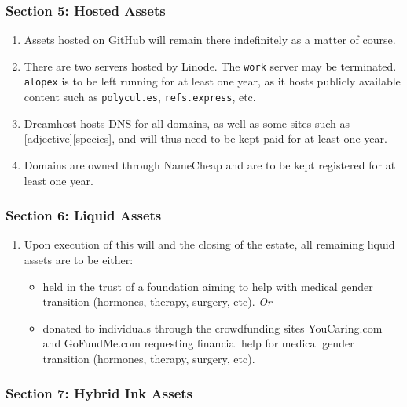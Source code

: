 \documentclass[oneside]{memoir}
\begin{document}
\subsubsection*{Section 5: Hosted Assets}\label{section-5-hosted-assets}

\begin{enumerate}
\def\labelenumi{\arabic{enumi}.}
\tightlist
\item
  Assets hosted on GitHub will remain there indefinitely as a matter of course.
\item
  There are two servers hosted by Linode. The \texttt{work} server may be terminated. \texttt{alopex} is to be left running for at least one year, as it hosts publicly available content such as \texttt{polycul.es}, \texttt{refs.express}, etc.
\item
  Dreamhost hosts DNS for all domains, as well as some sites such as {[}adjective{]}{[}species{]}, and will thus need to be kept paid for at least one year.
\item
  Domains are owned through NameCheap and are to be kept registered for at least one year.
\end{enumerate}

\subsubsection*{Section 6: Liquid Assets}\label{section-6-liquid-assets}

\begin{enumerate}
\def\labelenumi{\arabic{enumi}.}
\tightlist
\item
  Upon execution of this will and the closing of the estate, all remaining liquid assets are to be either:

  \begin{itemize}
  \tightlist
  \item
    held in the trust of a foundation aiming to help with medical gender transition (hormones, therapy, surgery, etc). \emph{Or}
  \item
    donated to individuals through the crowdfunding sites YouCaring.com and GoFundMe.com requesting financial help for medical gender transition (hormones, therapy, surgery, etc).
  \end{itemize}
\end{enumerate}

\subsubsection*{Section 7: Hybrid Ink Assets}\label{section-7-hybrid-ink-assets}
\end{document}
